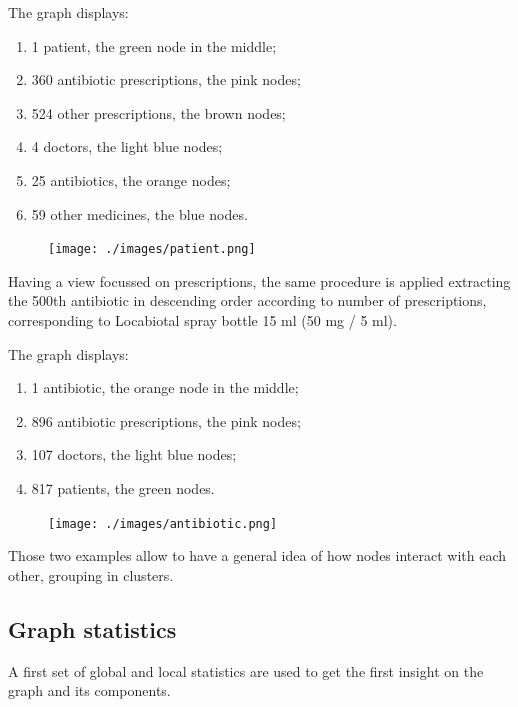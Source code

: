 The graph displays:
\begin{enumerate}
	\item 1 patient, the green node in the middle;
	\item 360 antibiotic prescriptions, the pink nodes;
	\item 524 other prescriptions, the brown nodes;
	\item 4 doctors, the light blue nodes;
	\item 25 antibiotics, the orange nodes;
	\item 59 other medicines, the blue nodes. 
\end{enumerate}

\begin{figure}[h]
	\centering
	\texttt{[image: ./images/patient.png]}
\end{figure}

Having a view focussed on prescriptions, the same procedure is applied extracting the 500th antibiotic in descending order according to number of prescriptions, corresponding to Locabiotal spray bottle 15 ml (50 mg / 5 ml).

The graph displays:
\begin{enumerate}
	\item 1 antibiotic, the orange node in the middle;
	\item 896 antibiotic prescriptions, the pink nodes;
	\item 107 doctors, the light blue nodes;
	\item 817 patients, the green nodes.
\end{enumerate}

\begin{figure}[h]
	\centering
	\texttt{[image: ./images/antibiotic.png]}
\end{figure}

Those two examples allow to have a general idea of how nodes interact with each other, grouping in clusters. 

\subsection{Graph statistics}
A first set of global and local statistics are used to get the first insight on the graph and its components.

